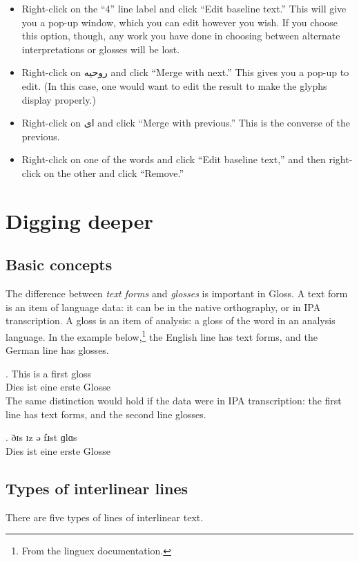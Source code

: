 \documentclass[oneside]{book}
\def\gloss{\textsf{Gloss}}
\def\p#1{\textfarsi{#1}}
\begin{document}
\begin{itemize}
\item Right-click on the ``4'' line label and click ``Edit baseline text.'' This will give you a pop-up window, which you can edit however you wish. If you choose this option, though, any work you have done in choosing between alternate interpretations or glosses will be lost.
\item Right-click on \p{روحیه} and click ``Merge with next.'' This gives you a pop-up to edit. (In this case, one would want to edit the result to make the glyphs display properly.)
\item Right-click on \p{ای} and click ``Merge with previous.'' This is the converse of the previous.
\item Right-click on one of the words and click ``Edit baseline text,'' and then right-click on the other and click ``Remove.''
\end{itemize}

\chapter{Digging deeper}

\section{Basic concepts}
The difference between \emph{text forms} and \emph{glosses} is important in \gloss. A text form is an item of language data: it can be in the native orthography, or in IPA transcription. A gloss is an item of analysis: a gloss of the word in an analysis language. In the example below,\footnote{From the linguex documentation.} the English line has text forms, and the German line has glosses.

\exg. This is a first gloss\\
Dies ist eine erste Glosse\\

The same distinction would hold if the data were in IPA transcription: the first line has text forms, and the second line glosses.

\exg. ðɪs ɪz ə fɹst ɡlɑs\\
Dies ist eine erste Glosse\\

\section{Types of interlinear lines}\label{sect:types-of-interlinear-lines}
There are five types of lines of interlinear text.
\end{document}
